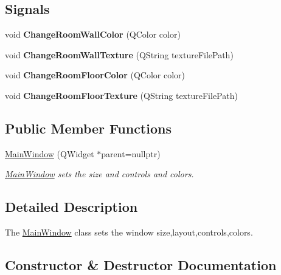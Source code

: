 \subsection*{Signals}
\begin{DoxyCompactItemize}
\item 
\hypertarget{class_main_window_a5a43372ffcce6aae9bb86d5b416854e1}{}void {\bfseries Change\+Room\+Wall\+Color} (Q\+Color color)\label{class_main_window_a5a43372ffcce6aae9bb86d5b416854e1}

\item 
\hypertarget{class_main_window_af86ec5a624baa391275a7b56e2729187}{}void {\bfseries Change\+Room\+Wall\+Texture} (Q\+String texture\+File\+Path)\label{class_main_window_af86ec5a624baa391275a7b56e2729187}

\item 
\hypertarget{class_main_window_a541dbc413da170b85d675b40dea1c049}{}void {\bfseries Change\+Room\+Floor\+Color} (Q\+Color color)\label{class_main_window_a541dbc413da170b85d675b40dea1c049}

\item 
\hypertarget{class_main_window_a4f913649fd4c09474b369faa60967d3b}{}void {\bfseries Change\+Room\+Floor\+Texture} (Q\+String texture\+File\+Path)\label{class_main_window_a4f913649fd4c09474b369faa60967d3b}

\end{DoxyCompactItemize}
\subsection*{Public Member Functions}
\begin{DoxyCompactItemize}
\item 
\hyperlink{class_main_window_a996c5a2b6f77944776856f08ec30858d}{Main\+Window} (Q\+Widget $\ast$parent=nullptr)
\begin{DoxyCompactList}\small\item\em \hyperlink{class_main_window}{Main\+Window} sets the size and controls and colors. \end{DoxyCompactList}\end{DoxyCompactItemize}


\subsection{Detailed Description}
The \hyperlink{class_main_window}{Main\+Window} class sets the window size,layout,controls,colors. 

\subsection{Constructor \& Destructor Documentation}
\hypertarget{class_main_window_a996c5a2b6f77944776856f08ec30858d}{}
